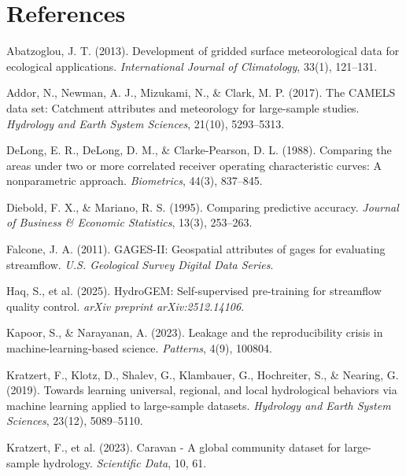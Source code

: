 \documentclass[12pt]{report}
\begin{document}
\chapter*{References}

\begin{enumerate}[label={[\arabic*]}]
  \item Abatzoglou, J. T. (2013). Development of gridded surface meteorological data for ecological applications. \textit{International Journal of Climatology}, 33(1), 121--131.

  \item Addor, N., Newman, A. J., Mizukami, N., \& Clark, M. P. (2017). The CAMELS data set: Catchment attributes and meteorology for large-sample studies. \textit{Hydrology and Earth System Sciences}, 21(10), 5293--5313.

  \item DeLong, E. R., DeLong, D. M., \& Clarke-Pearson, D. L. (1988). Comparing the areas under two or more correlated receiver operating characteristic curves: A nonparametric approach. \textit{Biometrics}, 44(3), 837--845.

  \item Diebold, F. X., \& Mariano, R. S. (1995). Comparing predictive accuracy. \textit{Journal of Business \& Economic Statistics}, 13(3), 253--263.

  \item Falcone, J. A. (2011). GAGES-II: Geospatial attributes of gages for evaluating streamflow. \textit{U.S. Geological Survey Digital Data Series}.

  \item Haq, S., et al. (2025). HydroGEM: Self-supervised pre-training for streamflow quality control. \textit{arXiv preprint arXiv:2512.14106}.

  \item Kapoor, S., \& Narayanan, A. (2023). Leakage and the reproducibility crisis in machine-learning-based science. \textit{Patterns}, 4(9), 100804.

  \item Kratzert, F., Klotz, D., Shalev, G., Klambauer, G., Hochreiter, S., \& Nearing, G. (2019). Towards learning universal, regional, and local hydrological behaviors via machine learning applied to large-sample datasets. \textit{Hydrology and Earth System Sciences}, 23(12), 5089--5110.

  \item Kratzert, F., et al. (2023). Caravan - A global community dataset for large-sample hydrology. \textit{Scientific Data}, 10, 61.


\end{enumerate}
\end{document}
